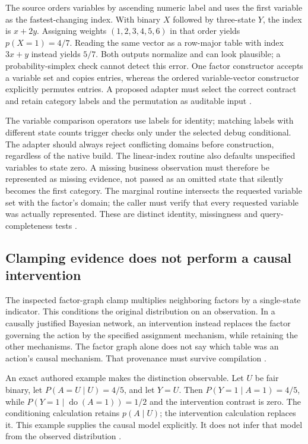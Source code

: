 The source orders variables by ascending numeric label and uses the first
variable as the fastest-changing index. With binary $X$ followed by
three-state $Y$, the index is $x+2y$. Assigning weights $(1,2,3,4,5,6)$ in
that order yields $p(X=1)=4/7$. Reading the same vector as a row-major table
with index $3x+y$ instead yields $5/7$. Both outputs normalize and can look
plausible; a probability-simplex check cannot detect this error. One factor
constructor accepts a variable set and copies entries, whereas the ordered
variable-vector constructor explicitly permutes entries. A proposed adapter
must select the correct contract and retain category labels and the
permutation as auditable input \citep{exec24_libdai_source,exec24_libdai_choice}.

The variable comparison operators use labels for identity; matching labels
with different state counts trigger checks only under the selected debug
conditional. The adapter should always reject conflicting domains before
construction, regardless of the native build. The linear-index routine also
defaults unspecified variables to state zero. A missing business observation
must therefore be represented as missing evidence, not passed as an omitted
state that silently becomes the first category. The marginal routine
intersects the requested variable set with the factor's domain; the caller
must verify that every requested variable was actually represented. These
are distinct identity, missingness and query-completeness tests
\citep{exec24_libdai_source}.

\subsection{Clamping evidence does not perform a causal intervention}
The inspected factor-graph clamp multiplies neighboring factors by a
single-state indicator. This conditions the original distribution on an
observation. In a causally justified Bayesian network, an intervention
instead replaces the factor governing the action by the specified assignment
mechanism, while retaining the other mechanisms. The factor graph alone
does not say which table was an action's causal mechanism. That provenance
must survive compilation \citep{exec24_libdai_source,exec24_libdai_choice}.

An exact authored example makes the distinction observable. Let $U$ be fair
binary, let $P(A=U\mid U)=4/5$, and let $Y=U$. Then
$P(Y=1\mid A=1)=4/5$, while
$P(Y=1\mid\operatorname{do}(A=1))=1/2$ and the intervention contrast is zero.
The conditioning calculation retains $p(A\mid U)$; the intervention
calculation replaces it. This example supplies the causal model explicitly.
It does not infer that model from the observed distribution
\citep{exec24_libdai_choice}.

